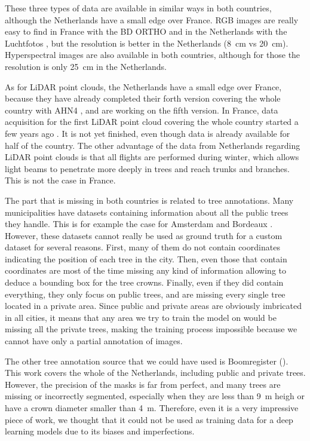 \documentclass[
]{report}
\begin{document}
These three types of data are available in similar ways in both
countries, although the Netherlands have a small edge over France. RGB
images are really easy to find in France with the BD ORTHO
\autocite{IGN_BDORTHO} and in the Netherlands with the Luchtfotos
\autocite{Luchtfotos}, but the resolution is better in the Netherlands
(8~cm vs 20~cm). Hyperspectral images are also available in both
countries, although for those the resolution is only 25~cm in the
Netherlands.

As for LiDAR point clouds, the Netherlands have a small edge over
France, because they have already completed their forth version covering
the whole country with AHN4 \autocite{AHN4}, and are working on the
fifth version. In France, data acquisition for the first LiDAR point
cloud covering the whole country started a few years ago
\autocite{IGN_LiDARHD}. It is not yet finished, even though data is
already available for half of the country. The other advantage of the
data from Netherlands regarding LiDAR point clouds is that all flights
are performed during winter, which allows light beams to penetrate more
deeply in trees and reach trunks and branches. This is not the case in
France.

The part that is missing in both countries is related to tree
annotations. Many municipalities have datasets containing information
about all the public trees they handle. This is for example the case for
Amsterdam \autocite{amsterdam_trees} and Bordeaux
\autocite{bordeaux_trees}. However, these datasets cannot really be used
as ground truth for a custom dataset for several reasons. First, many of
them do not contain coordinates indicating the position of each tree in
the city. Then, even those that contain coordinates are most of the time
missing any kind of information allowing to deduce a bounding box for
the tree crowns. Finally, even if they did contain everything, they only
focus on public trees, and are missing every single tree located in a
private area. Since public and private areas are obviously imbricated in
all cities, it means that any area we try to train the model on would be
missing all the private trees, making the training process impossible
because we cannot have only a partial annotation of images.

The other tree annotation source that we could have used is Boomregister
(\autocite{boomregister}). This work covers the whole of the
Netherlands, including public and private trees. However, the precision
of the masks is far from perfect, and many trees are missing or
incorrectly segmented, especially when they are less than 9~m heigh or
have a crown diameter smaller than 4~m. Therefore, even it is a very
impressive piece of work, we thought that it could not be used as
training data for a deep learning models due to its biases and
imperfections.
\end{document}
